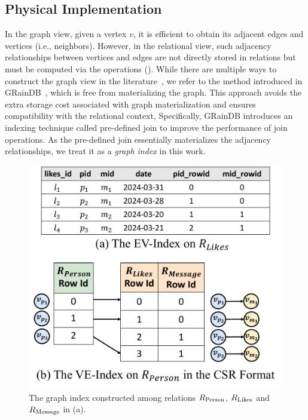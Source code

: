 

\subsection{Physical Implementation}
\label{sec:physical-operators}

In the graph view, given a vertex $v$, it is efficient to obtain its adjacent edges and vertices (i.e., neighbors). However, in the relational view, such adjacency relationships between vertices and edges are not directly stored in relations but must be computed via the \EVjoin operations (). While there are multiple ways to construct the graph view in the literature~\cite{gart,GRFusion}, we refer to the method introduced in GRainDB~\cite{graindb}, which is free from materializing the graph. This approach avoids the extra storage cost associated with graph materialization and ensures compatibility with the relational context,
Specifically, GRainDB introduces an indexing technique called pre-defined join to improve the performance of join operations. As the pre-defined join essentially materializes the adjacency relationships, we treat it as a \emph{graph index} in this work.


\begin{figure}[t]
    \centering
    \includegraphics[width=.72\linewidth]{./figures/graph-index-likes.pdf}
    \caption{The graph index constructed among relations ${R_{\text{Person}}}$, ${R_{\text{Likes}}}$
    and ${R_{\text{Message}}}$ in (a).}
    \label{fig:graph-index}
\end{figure}

